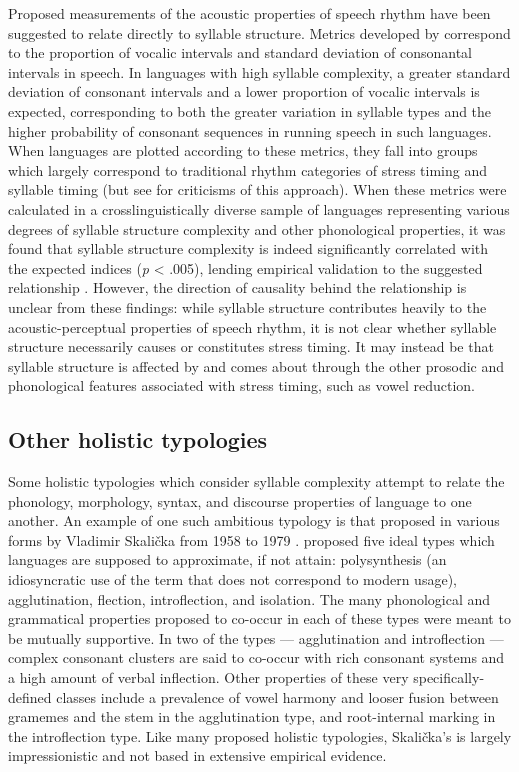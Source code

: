   Proposed measurements of the acoustic properties of speech rhythm have been suggested to relate directly to syllable structure. Metrics developed by \citet{RamusEtAl1999} correspond to the proportion of vocalic intervals and standard deviation of consonantal intervals in speech. In languages with high syllable complexity, a greater standard deviation of consonant intervals and a lower proportion of vocalic intervals is expected, corresponding to both the greater variation in syllable types and the higher probability of consonant sequences in running speech in such languages. When languages are plotted according to these metrics, they fall into groups which largely correspond to traditional rhythm categories of stress timing and syllable timing (but see \citealt{WigetEtAl2010} for criticisms of this approach). When these metrics were calculated in a crosslinguistically diverse sample of languages representing various degrees of syllable structure complexity and other phonological properties, it was found that syllable structure complexity is indeed significantly correlated with the expected indices (\textit{p} < .005), lending empirical validation to the suggested relationship \citep{EasterdayEtAl2011}. However, the direction of causality behind the relationship is unclear from these findings: while syllable structure contributes heavily to the acoustic-perceptual properties of speech rhythm, it is not clear whether syllable structure necessarily causes or constitutes stress timing. It may instead be that syllable structure is affected by and comes about through the other prosodic and phonological features associated with stress timing, such as vowel reduction.

\subsection{Other holistic typologies}\label{sec:1.3.2}

 Some holistic typologies which consider syllable complexity attempt to relate the phonology, morphology, syntax, and discourse properties of language to one another. An example of one such ambitious typology is that proposed in various forms by Vladimir Skalička from 1958 to 1979 \citep{Plank1998}. \citet{Skalička1979} proposed five ideal types which languages are supposed to approximate, if not attain: polysynthesis (an idiosyncratic use of the term that does not correspond to modern usage), agglutination, flection, introflection, and isolation. The many phonological and grammatical properties proposed to co-occur in each of these types were meant to be mutually supportive. In two of the types — agglutination and introflection — complex consonant clusters are said to co-occur with rich consonant systems and a high amount of verbal inflection. Other properties of these very specifically-defined classes include a prevalence of vowel harmony and looser fusion between gramemes and the stem in the agglutination type, and root-internal marking in the introflection type. Like many proposed holistic typologies, Skalička’s is largely impressionistic and not based in extensive empirical evidence.

